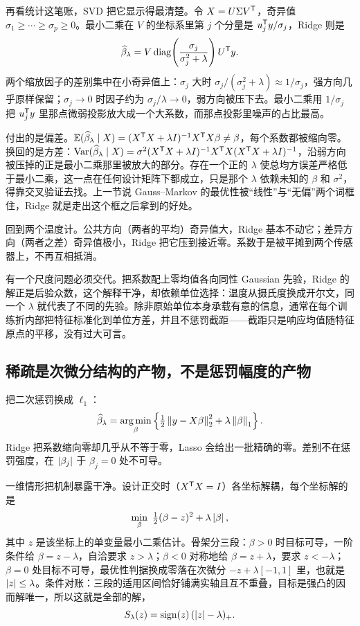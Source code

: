 再看统计这笔账，SVD 把它显示得最清楚。令 \(X=U\Sigma V^{\mathsf{T}}\)，奇异值 \(\sigma_1\ge\cdots\ge\sigma_p\ge 0\)。最小二乘在 \(V\) 的坐标系里第 \(j\) 个分量是 \(u_j^{\mathsf{T}}y/\sigma_j\)，Ridge 则是
\[
\widehat\beta_\lambda=V\operatorname{diag}\!\left(\frac{\sigma_j}{\sigma_j^2+\lambda}\right)U^{\mathsf{T}}y .
\]
两个缩放因子的差别集中在小奇异值上：\(\sigma_j\) 大时 \(\sigma_j/(\sigma_j^2+\lambda)\approx 1/\sigma_j\)，强方向几乎原样保留；\(\sigma_j\to 0\) 时因子约为 \(\sigma_j/\lambda\to 0\)，弱方向被压下去。最小二乘用 \(1/\sigma_j\) 把 \(u_j^{\mathsf{T}}y\) 里那点微弱投影放大成一个大系数，而那点投影里噪声的占比最高。

付出的是偏差。\(\mathbb{E}(\widehat\beta_\lambda\mid X)=(X^{\mathsf{T}}X+\lambda I)^{-1}X^{\mathsf{T}}X\beta\ne\beta\)，每个系数都被缩向零。换回的是方差：\(\operatorname{Var}(\widehat\beta_\lambda\mid X)=\sigma^2(X^{\mathsf{T}}X+\lambda I)^{-1}X^{\mathsf{T}}X(X^{\mathsf{T}}X+\lambda I)^{-1}\)，沿弱方向被压掉的正是最小二乘那里被放大的部分。存在一个正的 \(\lambda\) 使总均方误差严格低于最小二乘，这一点在任何设计矩阵下都成立，只是那个 \(\lambda\) 依赖未知的 \(\beta\) 和 \(\sigma^2\)，得靠交叉验证去找。上一节说 Gauss--Markov 的最优性被``线性''与``无偏''两个词框住，Ridge 就是走出这个框之后拿到的好处。

回到两个温度计。公共方向（两者的平均）奇异值大，Ridge 基本不动它；差异方向（两者之差）奇异值极小，Ridge 把它压到接近零。系数于是被平摊到两个传感器上，不再互相抵消。

有一个尺度问题必须交代。把系数配上零均值各向同性 Gaussian 先验，Ridge 的解正是后验众数，这个解释干净，却依赖单位选择：温度从摄氏度换成开尔文，同一个 \(\lambda\) 就代表了不同的先验。除非原始单位本身承载有意的信息，通常在每个训练折内部把特征标准化到单位方差，并且不惩罚截距——截距只是响应均值随特征原点的平移，没有过大可言。

\subsection{稀疏是次微分结构的产物，不是惩罚幅度的产物}

把二次惩罚换成 \(\ell_1\)：
\[
\widehat\beta_\lambda=\operatorname*{arg\,min}_\beta\left\{\tfrac12\left\lVert y-X\beta\right\rVert_2^2+\lambda\left\lVert\beta\right\rVert_1\right\}.
\]
Ridge 把系数缩向零却几乎从不等于零，Lasso 会给出一批精确的零。差别不在惩罚强度，在 \(\left|\beta_j\right|\) 于 \(\beta_j=0\) 处不可导。

一维情形把机制暴露干净。设计正交时（\(X^{\mathsf{T}}X=I\)）各坐标解耦，每个坐标解的是
\[
\min_\beta\ \tfrac12(\beta-z)^2+\lambda\abs{\beta},
\]
其中 \(z\) 是该坐标上的单变量最小二乘估计。骨架分三段：\(\beta>0\) 时目标可导，一阶条件给 \(\beta=z-\lambda\)，自洽要求 \(z>\lambda\)；\(\beta<0\) 对称地给 \(\beta=z+\lambda\)，要求 \(z<-\lambda\)；\(\beta=0\) 处目标不可导，最优性判据换成零落在次微分 \(-z+\lambda[-1,1]\) 里，也就是 \(\left|z\right|\le\lambda\)。条件对账：三段的适用区间恰好铺满实轴且互不重叠，目标是强凸的因而解唯一，所以这就是全部的解，
\[
S_\lambda(z)=\operatorname{sign}(z)\,(\left|z\right|-\lambda)_+ .
\]

